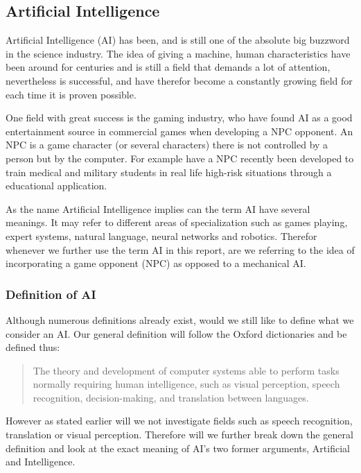 


\subsection{Artificial Intelligence} \label{sec:ai}
Artificial Intelligence (AI) has been, and is still one of the absolute big buzzword in the science industry.
The idea of giving a machine, human characteristics have been around for centuries and is still a field that demands a lot of attention, \cite {Buchanan2006} nevertheless is successful, \cite {Franz2014} \cite {Varkey2014} and have therefor become a constantly growing field for each time it is proven possible. \cite {Kilde} 

One field with great success is the gaming industry, who have found AI as a good entertainment source in commercial games when developing a NPC opponent. \cite {kilde}  An NPC is a game character (or several characters) there is not controlled by a person but by the computer. \cite {Definition2014}  For example have a NPC recently been developed to train medical and military students in real life high-risk situations through a educational application. \cite {kilde} 

As the name Artificial Intelligence implies can the term AI have several meanings. It may refer to different areas of specialization such as games playing, expert systems, natural language, neural networks and robotics. \cite {Vangie2014} 
Therefor whenever we further use the term AI in this report, are we referring to the idea of incorporating a game opponent (NPC) as opposed to a mechanical AI.



\subsubsection{Definition of AI}

Although numerous definitions already exist, would we still like to define what we consider an AI. Our general definition will follow the Oxford dictionaries and be defined thus:

		\begin{quote}
		The theory and development of computer systems able to perform tasks normally requiring human 		intelligence, such as visual perception, speech recognition, decision-making, and translation between languages. \cite {Oxford2014} 
		\end{quote}

However as stated earlier will we not investigate fields such as speech recognition, translation or visual perception. Therefore will we further break down the general definition and look at the exact meaning of AI's two former arguments, Artificial and Intelligence.

